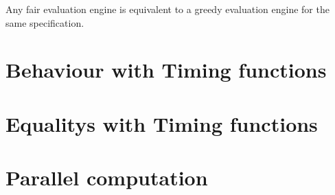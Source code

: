   \begin{theorem}[name = Equivalence of Fair and Greedy Evaluation Engines]\label{theorem:equivalence_greedy_fair_engines}
    Any fair evaluation engine is equivalent to a greedy evaluation engine for the same specification.
  \end{theorem}

  \section{Behaviour with Timing functions}
  \label{sec:behaviours:with_timing}
  \section{Equalitys with Timing functions}
  \label{sec:behaviours:with_timing}
  \section{Parallel computation}
